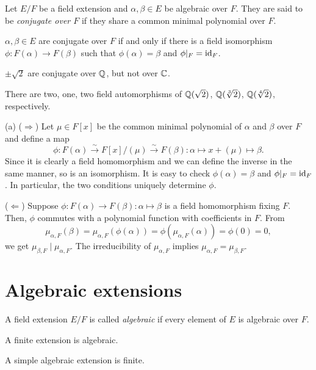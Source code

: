 \documentclass{../../large}
\begin{document}
\begin{prb}
Let $E/F$ be a field extension and $\alpha,\beta\in E$ be algebraic over $F$.
They are said to be \emph{conjugate over $F$} if they share a common minimal polynomial over $F$.
\begin{parts}
\item $\alpha,\beta\in E$ are conjugate over $F$ if and only if there is a field isomorphism $\phi:F(\alpha)\to F(\beta)$ such that $\phi(\alpha)=\beta$ and $\phi|_F=\operatorname{id}_F$.
\item $\pm\sqrt2$ are conjugate over $\mathbb{Q}$, but not over $\mathbb{C}$.
\item There are two, one, two field automorphisms of $\mathbb{Q}(\sqrt2)$, $\mathbb{Q}(\sqrt[3]2)$, $\mathbb{Q}(\sqrt[4]2)$, respectively.
\end{parts}
\end{prb}
\begin{pf}
(a)
($\Rightarrow$)
Let $\mu\in F[x]$ be the common minimal polynomial of $\alpha$ and $\beta$ over $F$ and define a map
\[\phi:F(\alpha)\stackrel\sim\to F[x]/(\mu)\stackrel\sim\to F(\beta):\alpha\mapsto x+(\mu)\mapsto\beta.\]
Since it is clearly a field homomorphism and we can define the inverse in the same manner, so is an isomorphism.
It is easy to check $\phi(\alpha)=\beta$ and $\phi|_F=\operatorname{id}_F$.
In particular, the two conditions uniquely determine $\phi$.

($\Leftarrow$)
Suppose $\phi:F(\alpha)\to F(\beta):\alpha\mapsto\beta$ is a field homomorphism fixing $F$.
Then, $\phi$ commutes with a polynomial function with coefficients in $F$.
From
\[\mu_{\alpha,F}(\beta)=\mu_{\alpha,F}(\phi(\alpha))=\phi(\mu_{\alpha,F}(\alpha))=\phi(0)=0,\]
we get $\mu_{\beta,F}\mid\mu_{\alpha,F}$.
The irreducibility of $\mu_{\alpha,F}$ implies $\mu_{\alpha,F}=\mu_{\beta,F}$.
\end{pf}



\section{Algebraic extensions}

\begin{prb}
A field extension $E/F$ is called \emph{algebraic} if every element of $E$ is algebraic over $F$.
\begin{parts}
\item A finite extension is algebraic.
\item A simple algebraic extension is finite.
\end{parts}
\end{prb}
\end{document}
